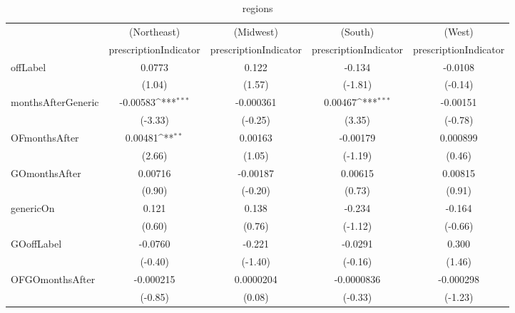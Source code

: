 \begin{table}[htbp]\centering
\def\sym#1{\ifmmode^{#1}\else\(^{#1}\)\fi}
\caption{regions\label{tab1}}
\begin{tabular}{l*{4}{c}}
\hline\hline
            &\multicolumn{1}{c}{(Northeast)}&\multicolumn{1}{c}{(Midwest)}&\multicolumn{1}{c}{(South)}&\multicolumn{1}{c}{(West)}\\
            &\multicolumn{1}{c}{prescriptionIndicator}&\multicolumn{1}{c}{prescriptionIndicator}&\multicolumn{1}{c}{prescriptionIndicator}&\multicolumn{1}{c}{prescriptionIndicator}\\
\hline
offLabel    &      0.0773         &       0.122         &      -0.134         &     -0.0108         \\
            &      (1.04)         &      (1.57)         &     (-1.81)         &     (-0.14)         \\
[1em]
monthsAfterGeneric&    -0.00583\sym{***}&   -0.000361         &     0.00467\sym{***}&    -0.00151         \\
            &     (-3.33)         &     (-0.25)         &      (3.35)         &     (-0.78)         \\
[1em]
OFmonthsAfter&     0.00481\sym{**} &     0.00163         &    -0.00179         &    0.000899         \\
            &      (2.66)         &      (1.05)         &     (-1.19)         &      (0.46)         \\
[1em]
GOmonthsAfter&     0.00716         &    -0.00187         &     0.00615         &     0.00815         \\
            &      (0.90)         &     (-0.20)         &      (0.73)         &      (0.91)         \\
[1em]
genericOn   &       0.121         &       0.138         &      -0.234         &      -0.164         \\
            &      (0.60)         &      (0.76)         &     (-1.12)         &     (-0.66)         \\
[1em]
GOoffLabel  &     -0.0760         &      -0.221         &     -0.0291         &       0.300         \\
            &     (-0.40)         &     (-1.40)         &     (-0.16)         &      (1.46)         \\
[1em]
OFGOmonthsAfter&   -0.000215         &   0.0000204         &  -0.0000836         &   -0.000298         \\
            &     (-0.85)         &      (0.08)         &     (-0.33)         &     (-1.23)         \\

\end{tabular}
\end{table}

